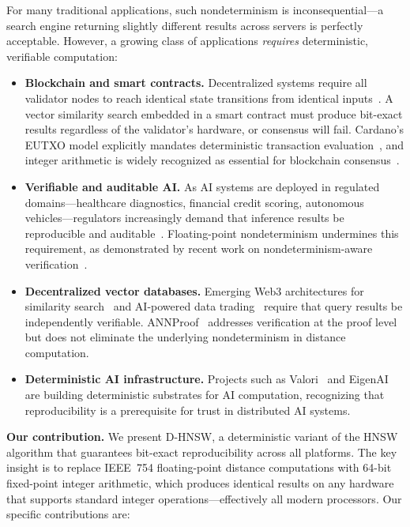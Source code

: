 \documentclass[10pt,journal,compsoc]{IEEEtran}
\newcommand{\dhnsw}{\textsc{D-HNSW}}
\newcommand{\hnsw}{\textsc{HNSW}}
\begin{document}
For many traditional applications, such nondeterminism is inconsequential---a search engine returning slightly different results across servers is perfectly acceptable. However, a growing class of applications \emph{requires} deterministic, verifiable computation:

\begin{itemize}[leftmargin=*]
  \item \textbf{Blockchain and smart contracts.} Decentralized systems require all validator nodes to reach identical state transitions from identical inputs~\cite{buterin2014ethereum, lai2022blockchain}. A vector similarity search embedded in a smart contract must produce bit-exact results regardless of the validator's hardware, or consensus will fail. Cardano's EUTXO model explicitly mandates deterministic transaction evaluation~\cite{cardano2024fees}, and integer arithmetic is widely recognized as essential for blockchain consensus~\cite{decenomy2024integer}.

  \item \textbf{Verifiable and auditable AI.} As AI systems are deployed in regulated domains---healthcare diagnostics, financial credit scoring, autonomous vehicles---regulators increasingly demand that inference results be reproducible and auditable~\cite{alves2026eigenai}. Floating-point nondeterminism undermines this requirement, as demonstrated by recent work on nondeterminism-aware verification~\cite{yao2025nao}.

  \item \textbf{Decentralized vector databases.} Emerging Web3 architectures for similarity search~\cite{keizer2023ditto, lee2024decentface} and AI-powered data trading~\cite{zhang2024nmft} require that query results be independently verifiable. ANNProof~\cite{lu2024annproof} addresses verification at the proof level but does not eliminate the underlying nondeterminism in distance computation.

  \item \textbf{Deterministic AI infrastructure.} Projects such as Valori~\cite{gudur2025valori} and EigenAI~\cite{alves2026eigenai} are building deterministic substrates for AI computation, recognizing that reproducibility is a prerequisite for trust in distributed AI systems.
\end{itemize}

\noindent\textbf{Our contribution.} We present \dhnsw{}, a deterministic variant of the \hnsw{} algorithm that guarantees bit-exact reproducibility across all platforms. The key insight is to replace IEEE~754 floating-point distance computations with 64-bit fixed-point integer arithmetic, which produces identical results on any hardware that supports standard integer operations---effectively all modern processors. Our specific contributions are:
\end{document}
